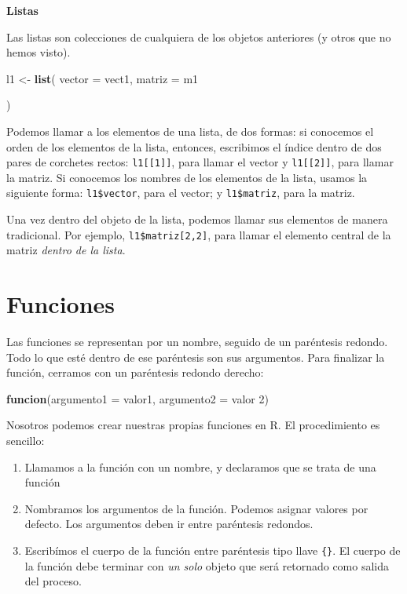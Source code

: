 \documentclass[12pt,letterpaper,]{book}
\newenvironment{Shaded}{\begin{snugshade}}{\end{snugshade}}
\newcommand{\KeywordTok}[1]{\textcolor[rgb]{0.13,0.29,0.53}{\textbf{#1}}}
\newcommand{\DataTypeTok}[1]{\textcolor[rgb]{0.13,0.29,0.53}{#1}}
\newcommand{\DecValTok}[1]{\textcolor[rgb]{0.00,0.00,0.81}{#1}}
\newcommand{\StringTok}[1]{\textcolor[rgb]{0.31,0.60,0.02}{#1}}
\newcommand{\NormalTok}[1]{#1}
\begin{document}
\textbf{Listas}

Las listas son colecciones de cualquiera de los objetos anteriores (y
otros que no hemos visto).

\begin{Shaded}
\begin{Highlighting}[]
\NormalTok{l1 <-}\StringTok{ }\KeywordTok{list}\NormalTok{(}
  \DataTypeTok{vector =}\NormalTok{ vect1,}
  \DataTypeTok{matriz =}\NormalTok{ m1}
  
\NormalTok{)}
\end{Highlighting}
\end{Shaded}

Podemos llamar a los elementos de una lista, de dos formas: si conocemos
el orden de los elementos de la lista, entonces, escribimos el índice
dentro de dos pares de corchetes rectos: \texttt{l1{[}{[}1{]}{]}}, para
llamar el vector y \texttt{l1{[}{[}2{]}{]}}, para llamar la matriz. Si
conocemos los nombres de los elementos de la lista, usamos la siguiente
forma: \texttt{l1\$vector}, para el vector; y \texttt{l1\$matriz}, para
la matriz.

Una vez dentro del objeto de la lista, podemos llamar sus elementos de
manera tradicional. Por ejemplo, \texttt{l1\$matriz{[}2,2{]}}, para
llamar el elemento central de la matriz \emph{dentro de la lista}.

\section{Funciones}\label{funciones}

Las funciones se representan por un nombre, seguido de un paréntesis
redondo. Todo lo que esté dentro de ese paréntesis son sus argumentos.
Para finalizar la función, cerramos con un paréntesis redondo derecho:

\begin{Shaded}
\begin{Highlighting}[]
\KeywordTok{funcion}\NormalTok{(}\DataTypeTok{argumento1 =}\NormalTok{ valor1,  }\DataTypeTok{argumento2 =}\NormalTok{ valor }\DecValTok{2}\NormalTok{)}
\end{Highlighting}
\end{Shaded}

Nosotros podemos crear nuestras propias funciones en R. El procedimiento
es sencillo:

\begin{enumerate}
\def\labelenumi{\arabic{enumi}.}
\item
  Llamamos a la función con un nombre, y declaramos que se trata de una
  función
\item
  Nombramos los argumentos de la función. Podemos asignar valores por
  defecto. Los argumentos deben ir entre paréntesis redondos.
\item
  Escribímos el cuerpo de la función entre paréntesis tipo llave
  \texttt{\{\}}. El cuerpo de la función debe terminar con \emph{un
  solo} objeto que será retornado como salida del proceso.
\end{enumerate}
\end{document}
